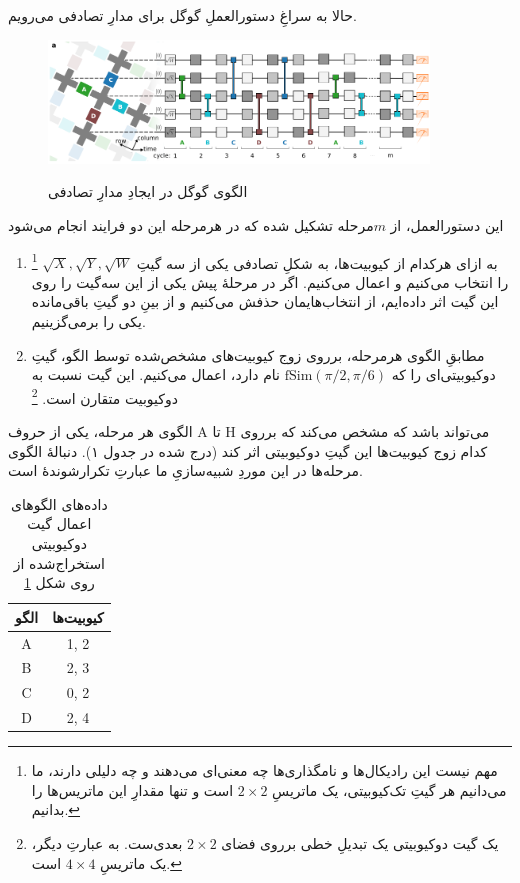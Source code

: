 \documentclass[11pt]{article}
\begin{document}
حالا به سراغِ دستورالعملِ گوگل برای مدارِ تصادفی می‌رویم.

\begin{figure}[H]
\centering
\includegraphics[width=0.9\textwidth]{res/google_circuit.png}
\label{fig:google_circuit}
\caption{الگوی گوگل در ایجادِ مدارِ تصادفی \cite{google}}
\end{figure}

این دستورالعمل، از $m$مرحله تشکیل شده که در هرمرحله این دو فرایند انجام می‌شود

\begin{enumerate}[-]
\item 
به ازای هرکدام از کیوبیت‌ها، به شکلِ تصادفی یکی از سه گیتِ $\sqrt{X}, \sqrt{Y}, \sqrt{W}$
\footnote{مهم نیست این رادیکال‌ها و نامگذاری‌ها چه معنی‌ای می‌دهند و چه دلیلی دارند، ما می‌دانیم هر گیتِ تک‌کیوبیتی، یک ماتریسِ 
$2\times 2$
 است و تنها مقدارِ این ماتریس‌ها را بدانیم.}
 را انتخاب می‌کنیم و اعمال می‌کنیم. اگر در مرحلهٔ پیش یکی از این سه‌گیت را روی این گیت اثر داده‌ایم، از انتخاب‌هایمان حذفش می‌کنیم و از بینِ دو گیتِ باقی‌مانده یکی را برمی‌گزینیم.

\item
مطابقِ الگوی هرمرحله، برروی زوج کیوبیت‌های مشخص‌شده توسط الگو، گیتِ دوکیوبیتی‌‌ای را که $\text{fSim}(\pi/2, \pi/6)$ نام دارد، اعمال می‌کنیم. این گیت نسبت به دوکیوبیت متقارن است.
\footnote{یک گیت دوکیوبیتی یک تبدیلِ خطی برروی فضای 
$2 \times 2$
بعدی‌ست. به عبارتِ دیگر، یک ماتریسِ 
$4 \times 4$
 است.}
\end{enumerate}

الگوی هر مرحله، یکی از حروف A تا H می‌تواند باشد که مشخص می‌کند که برروی کدام زوج کیوبیت‌ها این گیتِ دوکیوبیتی اثر کند (درج شده در جدول ۱). دنبالهٔ الگوی مرحله‌ها در این موردِ شبیه‌سازیِ ما عبارتِ تکرارشوندهٔ 
است.\cite{google}

\begin{table}[H]
  \centering
  \begin{tabular}{c|c}
    الگو & کیوبیت‌ها \\ \hline
    A & 1, 2 \\
    B & 2, 3 \\
    C & 0, 2 \\
    D & 2, 4 
  \end{tabular}
  \label{table:circuit_pattern}
  \caption{داده‌های الگوهای اعمال گیت دوکیوبیتی استخراج‌شده از روی شکل \ref{fig:google_circuit}}
\end{table}
 
\end{document}
